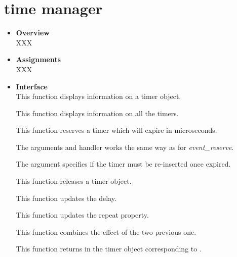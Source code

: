 %
%

\newpage

\section{\textbf{time} manager}
\begin{itemize}
  \item {\bf Overview}\\
    XXX
  \item {\bf Assignments}\\
    XXX
  \item {\bf Interface}\\
	 {
	   This function displays information on a timer object.
	 }

	 {
	   This function displays information on all the timers.
	 }

	 {
	   This function reserves a timer which will expire in
	    microseconds.

	   The arguments  and {handler} works the same
	   way as for \emph{event_reserve}.

	   The  argument specifies if the timer
	   must be re-inserted once expired.
	 }

	 {
	   This function releases a timer object.
	 }

	 {
	   This function updates the delay.
	 }

	 {
	   This function updates the repeat property.
	 }

	 {
	   This function combines the effect of the two previous one.
	 }

	 {
	   This function returns in  the timer object
	   corresponding to .
	 }


\end{itemize}
